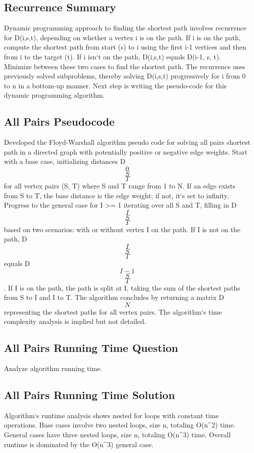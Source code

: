 \subsection*{Recurrence  Summary}
Dynamic programming approach to finding the shortest path involves recurrence for D(i,s,t), depending on whether a vertex i is on the path.
If i is on the path, compute the shortest path from start (s) to i using the first i-1 vertices and then from i to the target (t).
If i isn`t on the path, D(i,s,t) equals D(i-1, s, t).
Minimize between these two cases to find the shortest path.
The recurrence uses previously solved subproblems, thereby solving D(i,s,t) progressively for i from 0 to n in a bottom-up manner.
Next step is writing the pseudo-code for this dynamic programming algorithm.

\subsection*{All Pairs  Pseudocode}
Developed the Floyd-Warshall algorithm pseudo code for solving all pairs shortest path in a directed graph with potentially positive or negative edge weights.
Start with a base case, initializing distances D\[0\]\[S\]\[T\] for all vertex pairs (S, T) where S and T range from 1 to N\@.
If an edge exists from S to T, the base distance is the edge weight; if not, it`s set to infinity.
Progress to the general case for I \textgreater{}= 1 iterating over all S and T, filling in D\[I\]\[S\]\[T\] based on two scenarios: with or without vertex I on the path.
If I is not on the path, D\[I\]\[S\]\[T\] equals D\[I-1\]\[S\]\[T\].
If I is on the path, the path is split at I, taking the sum of the shortest paths from S to I and I to T\@.
The algorithm concludes by returning a matrix D\[N\] representing the shortest paths for all vertex pairs.
The algorithm`s time complexity analysis is implied but not detailed.

\subsection*{All Pairs  Running Time Question}
Analyze algorithm running time.

\subsection*{All Pairs  Running Time Solution}
Algorithm`s runtime analysis shows nested for loops with constant time operations.
Base cases involve two nested loops, size n, totaling O(n\textasciicircum{}2) time.
General cases have three nested loops, size n, totaling O(n\textasciicircum{}3) time.
Overall runtime is dominated by the O(n\textasciicircum{}3) general case.

